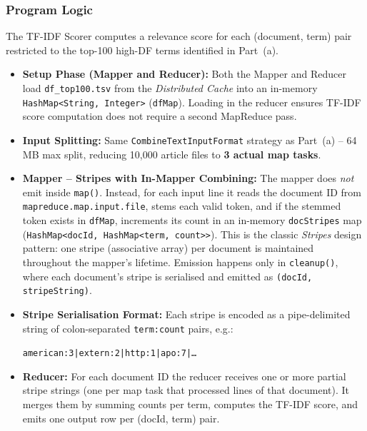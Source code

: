 \documentclass[12pt,a4paper]{article}
\begin{document}
\subsubsection{Program Logic}

The TF-IDF Scorer computes a relevance score for each (document, term) pair
restricted to the top-100 high-DF terms identified in Part~(a).

\begin{itemize}[leftmargin=1.4em]
    \item \textbf{Setup Phase (Mapper and Reducer):} Both the Mapper and
    Reducer load \texttt{df\_top100.tsv} from the \emph{Distributed Cache}
    into an in-memory \texttt{HashMap\textless String, Integer\textgreater}
    (\texttt{dfMap}).  Loading in the reducer ensures TF-IDF score computation
    does not require a second MapReduce pass.

    \item \textbf{Input Splitting:} Same \texttt{CombineTextInputFormat}
    strategy as Part~(a) -- 64\,MB max split, reducing 10,000 article files
    to \textbf{3 actual map tasks}.

    \item \textbf{Mapper -- Stripes with In-Mapper Combining:}
    The mapper does \emph{not} emit inside \texttt{map()}.  Instead, for each
    input line it reads the document ID from \texttt{mapreduce.map.input.file},
    stems each valid token, and if the stemmed token exists in \texttt{dfMap},
    increments its count in an in-memory \texttt{docStripes} map
    (\texttt{HashMap\textless docId, HashMap\textless term,
    count\textgreater\textgreater}).  This is the classic \emph{Stripes} design
    pattern: one stripe (associative array) per document is maintained
    throughout the mapper's lifetime.  Emission happens only in
    \texttt{cleanup()}, where each document's stripe is serialised and emitted
    as \texttt{(docId, stripeString)}.

    \item \textbf{Stripe Serialisation Format:} Each stripe is encoded as a
    pipe-delimited string of colon-separated \texttt{term:count} pairs, e.g.:
    \begin{center}
    \texttt{american:3|extern:2|http:1|apo:7|\ldots}
    \end{center}

    \item \textbf{Reducer:} For each document ID the reducer receives one or
    more partial stripe strings (one per map task that processed lines of that
    document).  It merges them by summing counts per term, computes the TF-IDF
    score, and emits one output row per (docId, term) pair.
\end{itemize}
\end{document}
